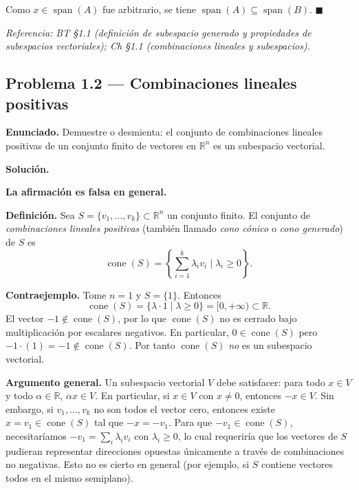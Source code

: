 \documentclass{article}
\begin{document}
Como $x \in \operatorname{span}(A)$ fue arbitrario, se tiene $\operatorname{span}(A) \subseteq \operatorname{span}(B)$. $\blacksquare$

\medskip\noindent\textit{Referencia: BT §1.1 (definición de subespacio generado y propiedades de subespacios vectoriales); Ch §1.1 (combinaciones lineales y subespacios).}

\newpage
\subsection*{Problema 1.2 — Combinaciones lineales positivas}

\textbf{Enunciado.} Demuestre o desmienta: el conjunto de combinaciones lineales positivas de un conjunto finito de vectores en $\mathbb{R}^n$ es un subespacio vectorial.

\medskip
\noindent\textbf{Solución.}

\textbf{La afirmación es falsa en general.}

\medskip
\noindent\textbf{Definición.} Sea $S = \{v_1, \ldots, v_k\} \subset \mathbb{R}^n$ un conjunto finito. El conjunto de \emph{combinaciones lineales positivas} (también llamado \emph{cono cónico} o \emph{cono generado}) de $S$ es
\[
\operatorname{cone}(S) = \left\{\sum_{i=1}^{k} \lambda_i v_i \;\Big|\; \lambda_i \geq 0\right\}.
\]

\medskip
\noindent\textbf{Contraejemplo.} Tome $n = 1$ y $S = \{1\}$. Entonces
\[
\operatorname{cone}(S) = \{\lambda \cdot 1 \mid \lambda \geq 0\} = [0, +\infty) \subset \mathbb{R}.
\]
El vector $-1 \notin \operatorname{cone}(S)$, por lo que $\operatorname{cone}(S)$ no es cerrado bajo multiplicación por escalares negativos. En particular, $0 \in \operatorname{cone}(S)$ pero $-1 \cdot (1) = -1 \notin \operatorname{cone}(S)$. Por tanto $\operatorname{cone}(S)$ \emph{no} es un subespacio vectorial.

\medskip
\noindent\textbf{Argumento general.} Un subespacio vectorial $V$ debe satisfacer: para todo $x \in V$ y todo $\alpha \in \mathbb{R}$, $\alpha x \in V$. En particular, si $x \in V$ con $x \neq 0$, entonces $-x \in V$. Sin embargo, si $v_1, \ldots, v_k$ no son todos el vector cero, entonces existe $x = v_1 \in \operatorname{cone}(S)$ tal que $-x = -v_1$. Para que $-v_1 \in \operatorname{cone}(S)$, necesitaríamos $-v_1 = \sum_i \lambda_i v_i$ con $\lambda_i \geq 0$, lo cual requeriría que los vectores de $S$ pudieran representar direcciones opuestas únicamente a través de combinaciones no negativas. Esto no es cierto en general (por ejemplo, si $S$ contiene vectores todos en el mismo semiplano).
\end{document}
